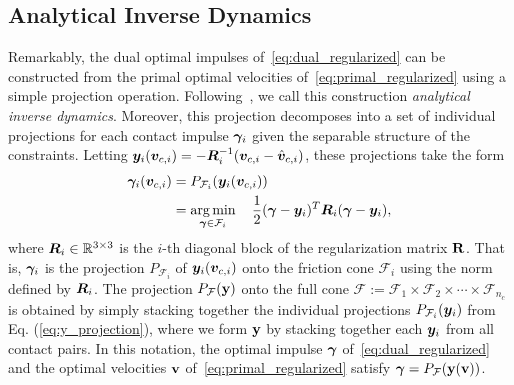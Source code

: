 
\subsection{Analytical Inverse Dynamics}
\label{sec:analytical_inverse_dynamics}

Remarkably,  the dual optimal impulses of~\eqref{eq:dual_regularized} can be
constructed from the primal optimal velocities of~\eqref{eq:primal_regularized}
using a simple projection operation. Following~\cite{bib:todorov2014}, we call
this construction  \textit{analytical inverse dynamics}. Moreover, this
projection decomposes into a set of individual projections for each contact
impulse ${\bm\gamma}_i$ given the separable structure of the constraints. Letting
${\bm{y}}_i({\bm{v}}_{c,i}) = -{\bm{R}}_i^{-1}({\bm{v}}_{c,i}-\hat{{\bm{v}}}_{c,i})$,
these projections take the form
\begin{equation}
  \begin{aligned}
	\bgamma_i(\vf{v}_{c,i})&= P_{\mathcal{F}_i}(\vf{y}_i(\vf{v}_{c,i}))\\
	&= \argmin_{\bgamma\in\mathcal{F}_i} \quad 
		\frac{1}{2}(\bgamma-\vf{y}_i)^T\vf{R}_i(\bgamma-\vf{y}_i),\\
	\end{aligned}
	\label{eq:y_projection}
\end{equation}
where ${\bm{R}}_i\in\mathbb{R}^{3\times3}$ is the $i\text{-th}$ diagonal block of
the regularization matrix ${\mathbf{R}}$. That is, ${\bm\gamma}_i$ is the projection
$P_{\mathcal{F}_i}$ of ${\bm{y}}_i({\bm{v}}_{c,i})$ onto the friction cone
$\mathcal{F}_i$ using the norm defined by ${\bm{R}}_i$. The projection
$P_{\mathcal{F}}({\mathbf{y}})$ onto the full cone $\mathcal{F} := \mathcal{F}_1
\times \mathcal{F}_2 \times \cdots \times \mathcal{F}_{n_c}$ is obtained by simply
stacking together the individual projections $P_{\mathcal{F}_i}({\bm{y}}_i)$ from
Eq. (\ref{eq:y_projection}), where we form ${\mathbf{y}}$ by stacking together each
${\bm{y}}_i$ from all contact pairs.  In this notation, the optimal impulse
${\bm\gamma}$ of~\eqref{eq:dual_regularized} and the optimal velocities ${\mathbf{v}}$
of~\eqref{eq:primal_regularized} satisfy  ${\bm\gamma} =
P_{\mathcal{F}}({\mathbf{y}}({\mathbf{v}}))$.
